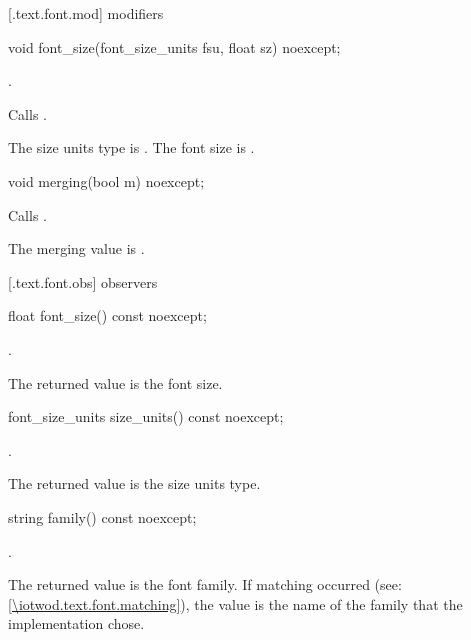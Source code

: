  [\iotwod.text.font.mod] { modifiers}

%
\begin{itemdecl}
void font_size(font_size_units fsu, float sz) noexcept;
\end{itemdecl}
\begin{itemdescr}
\pnum
\requires {}.

\pnum
\effects Calls .

\pnum
\remarks The size units type is . The font size is .
\end{itemdescr}

%
\begin{itemdecl}
void merging(bool m) noexcept;
\end{itemdecl}
\begin{itemdescr}
\pnum
\effects Calls .

\pnum
\remarks The merging value is .
\end{itemdescr}

 [\iotwod.text.font.obs] { observers}

%
\begin{itemdecl}
float font_size() const noexcept;
\end{itemdecl}
\begin{itemdescr}
\pnum
\returns {}.

\pnum
\remarks
The returned value is the font size.
\end{itemdescr}

%
\begin{itemdecl}
font_size_units size_units() const noexcept;
\end{itemdecl}
\begin{itemdescr}
\pnum
\returns {}.

\pnum
\remarks
The returned value is the size units type.
\end{itemdescr}

%
\begin{itemdecl}
string family() const noexcept;
\end{itemdecl}
\begin{itemdescr}
\pnum
\returns {}.

\pnum
\remarks
The returned value is the font family. If matching occurred (see: \ref{\iotwod.text.font.matching}), the value is the name of the family that the implementation chose.
\end{itemdescr}

